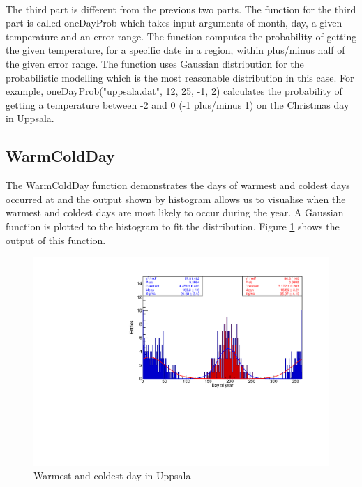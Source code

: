\documentclass[a4paper,12pt]{article}
\begin{document}
\paragraph{}
The third part is different from the previous two parts. The function for the third part is called oneDayProb which takes input arguments of month, day, a given temperature and an error range. The function computes the probability of getting the given temperature, for a specific date in a region, within plus/minus half of the given error range. The function uses Gaussian distribution for the probabilistic modelling which is the most reasonable distribution in this case. For example, oneDayProb("uppsala.dat", 12, 25, -1, 2) calculates the probability of getting a temperature between -2 and 0 (-1 plus/minus 1) on the Christmas day in Uppsala. 





\subsection{WarmColdDay}

The WarmColdDay function demonstrates the days of warmest and coldest days occurred at and the output shown by histogram allows us to visualise when the warmest and coldest days are most likely to occur during the year. A Gaussian function is plotted to the histogram to fit the distribution. Figure \ref{fig:WarmCold} shows the output of this function.\\





\begin{figure}[h!]
    \centering
    \includegraphics[scale = 0.8]{uppsala.pdf}
    \caption{Warmest and coldest day in Uppsala}
    \label{fig:WarmCold}
\end{figure}
\end{document}
